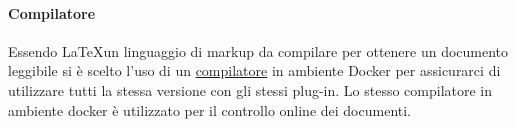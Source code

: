 \paragraph{Compilatore}
Essendo \LaTeX \space un linguaggio di markup da compilare per ottenere un documento
leggibile si è scelto l'uso di un
\href{https://github.com/dante-ev/docker-texlive}{compilatore} in ambiente Docker\glo
per assicurarci di utilizzare tutti la stessa versione con gli stessi plug-in.
Lo stesso compilatore in ambiente docker è utilizzato per il controllo online dei
documenti.
